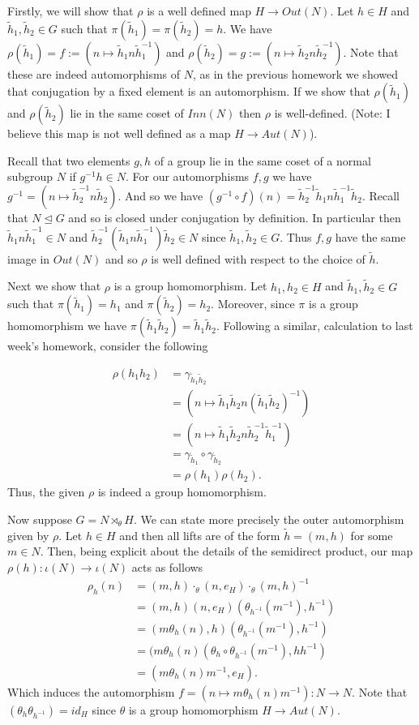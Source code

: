\documentclass[12pt,letterpaper,boxed]{hmcpset}
\newcommand{\tih}{\tilde h}
\newcommand{\inv}{^{-1}}
\newcommand{\normal}{\unlhd} %
\begin{document}
\begin{solution}
Firstly, we will show that $\rho$ is a well defined map $H \to
Out(N)$. Let $h \in H$ and $\tih_1, \tih_2 \in G$ such that $\pi(\tih_1)
= \pi(\tih_2) = h$. We have 
$\rho(\tih_1) = f := (n \mapsto \tih_1 n \tih_1\inv)$ and
$\rho(\tih_2) = g := (n \mapsto \tih_2 n \tih_2\inv)$. 
Note that these are indeed automorphisms of $N$, as in the previous
homework we showed that conjugation by a fixed element is an
automorphism.
If we show that $\rho(\tih_1)$ and $\rho(\tih_2)$ lie in the same
coset of $Inn(N)$ then $\rho$ is well-defined. (Note: I believe this
map is not well defined as a map $H \to Aut(N)$). 

Recall that two elements $g,h$ of a group lie in the same coset of a normal
subgroup $N$ if $g\inv h \in N$. For our automorphisms $f,g$ we have
$g\inv = (n \mapsto \tih_2\inv n \tih_2)$. And so we have 
$(g\inv \circ f)(n) = \tih_2\inv \tih_1 n \tih_1\inv \tih_2$. Recall
that $N \normal G$ and so is closed under conjugation by definition.
In particular then $\tih_1 n \tih_1\inv \in N$ and $\tih_2\inv(\tih_1
n \tih_1 \inv) \tih_2 \in N$ since $\tih_1, \tih_2 \in G$. 
Thus $f,g$ have the same image in $Out(N)$ and so $\rho$ is well
defined with respect to the choice of $\tih$. 

Next we show that $\rho$ is a group homomorphism. Let $h_1, h_2 \in H$
and $\tih_1, \tih_2 \in G$ such that $\pi(\tih_1) = h_1$ and
$\pi(\tih_2) = h_2$. Moreover, since $\pi$ is a group homomorphism we
have $\pi(\tih_1\tih_2) = \tih_1 \tih_2$. Following a similar,
calculation to last week's homework, consider the following

\begin{align*}
	\rho(h_1h_2) &= \gamma_{\tih_1\tih_2} \\
		&= (n \mapsto \tih_1\tih_2 n (\tih_1\tih_2)\inv) \\
		&= (n \mapsto \tih_1 \tih_2 n \tih_2\inv \tih_1\inv) \\
		&= \gamma_{\tih_1} \circ \gamma_{\tih_2} \\
		&= \rho(h_1)\rho(h_2).
\end{align*}
Thus, the given $\rho$ is indeed a group homomorphism.

Now suppose $G = N \rtimes_\theta H$. We can state more precisely the
outer automorphism given by $\rho$. Let $h \in H$ and then all lifts
are of the form $\tih = (m, h)$ for some $m \in N$. Then, being
explicit about the details of the semidirect product, our map
$\rho(h) : \iota(N) \to \iota(N)$ acts as follows 
\begin{align*}
	\rho_h(n) &= (m, h) \cdot_\theta (n, e_H) \cdot_\theta (m, h)\inv \\
		&= (m,h) (n, e_H) (\theta_{h\inv}(m\inv), h\inv) \\
		&= (m \theta_h(n), h) (\theta_{h\inv}(m\inv), h\inv) \\
		&= (m \theta_h(n) (\theta_h \circ \theta_{h\inv}(m\inv), h h\inv) \\
		&= (m \theta_h(n) m\inv, e_H).
\end{align*}
Which induces the automorphism $f = (n \mapsto m\theta_h(n)m\inv) : N \to
N$. Note that $(\theta_{h} \theta_{h\inv}) = id_H$ since $\theta$ is a
group homomorphism $H \to Aut(N)$. 


\end{solution}
\end{document}
